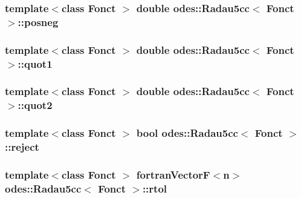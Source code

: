 \hypertarget{classodes_1_1Radau5cc_a4acabf9c37c68c6b50dd32c6a12724a6}{
\subsubsection[{posneg}]{\setlength{\rightskip}{0pt plus 5cm}template$<$class Fonct $>$ double {\bf odes\-::\-Radau5cc}$<$ Fonct $>$\-::posneg\hspace{0.3cm}{\ttfamily [private]}}}\label{classodes_1_1Radau5cc_a4acabf9c37c68c6b50dd32c6a12724a6}
\hypertarget{classodes_1_1Radau5cc_a0c3cc3ba99f9aca257eab5b3a1f4cb43}{
\subsubsection[{quot1}]{\setlength{\rightskip}{0pt plus 5cm}template$<$class Fonct $>$ double {\bf odes\-::\-Radau5cc}$<$ Fonct $>$\-::quot1\hspace{0.3cm}{\ttfamily [private]}}}\label{classodes_1_1Radau5cc_a0c3cc3ba99f9aca257eab5b3a1f4cb43}
\hypertarget{classodes_1_1Radau5cc_a66d2ae6f5ecac2c7983fe54293a6cc30}{
\subsubsection[{quot2}]{\setlength{\rightskip}{0pt plus 5cm}template$<$class Fonct $>$ double {\bf odes\-::\-Radau5cc}$<$ Fonct $>$\-::quot2\hspace{0.3cm}{\ttfamily [private]}}}\label{classodes_1_1Radau5cc_a66d2ae6f5ecac2c7983fe54293a6cc30}
\hypertarget{classodes_1_1Radau5cc_aedacfeb52f4072557c312adf7817bcf6}{
\subsubsection[{reject}]{\setlength{\rightskip}{0pt plus 5cm}template$<$class Fonct $>$ bool {\bf odes\-::\-Radau5cc}$<$ Fonct $>$\-::reject\hspace{0.3cm}{\ttfamily [private]}}}\label{classodes_1_1Radau5cc_aedacfeb52f4072557c312adf7817bcf6}
\hypertarget{classodes_1_1Radau5cc_a6fb4ed14d3b1141a927cbbaf3f3f5536}{
\subsubsection[{rtol}]{\setlength{\rightskip}{0pt plus 5cm}template$<$class Fonct $>$ {\bf fortran\-Vector\-F}$<${\bf n}$>$ {\bf odes\-::\-Radau5cc}$<$ Fonct $>$\-::rtol\hspace{0.3cm}{\ttfamily [private]}}}\label{classodes_1_1Radau5cc_a6fb4ed14d3b1141a927cbbaf3f3f5536}

